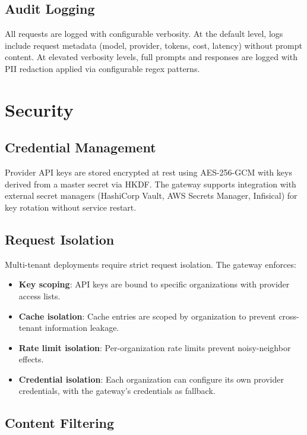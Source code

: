 \documentclass[11pt,twocolumn]{article}
\begin{document}
\subsection{Audit Logging}

All requests are logged with configurable verbosity. At the default level, logs include request metadata (model, provider, tokens, cost, latency) without prompt content. At elevated verbosity levels, full prompts and responses are logged with PII redaction applied via configurable regex patterns.

\section{Security}
\label{sec:security}

\subsection{Credential Management}

Provider API keys are stored encrypted at rest using AES-256-GCM with keys derived from a master secret via HKDF. The gateway supports integration with external secret managers (HashiCorp Vault, AWS Secrets Manager, Infisical) for key rotation without service restart.

\subsection{Request Isolation}

Multi-tenant deployments require strict request isolation. The gateway enforces:

\begin{itemize}[leftmargin=*]
    \item \textbf{Key scoping}: API keys are bound to specific organizations with provider access lists.
    \item \textbf{Cache isolation}: Cache entries are scoped by organization to prevent cross-tenant information leakage.
    \item \textbf{Rate limit isolation}: Per-organization rate limits prevent noisy-neighbor effects.
    \item \textbf{Credential isolation}: Each organization can configure its own provider credentials, with the gateway's credentials as fallback.
\end{itemize}

\subsection{Content Filtering}
\end{document}
